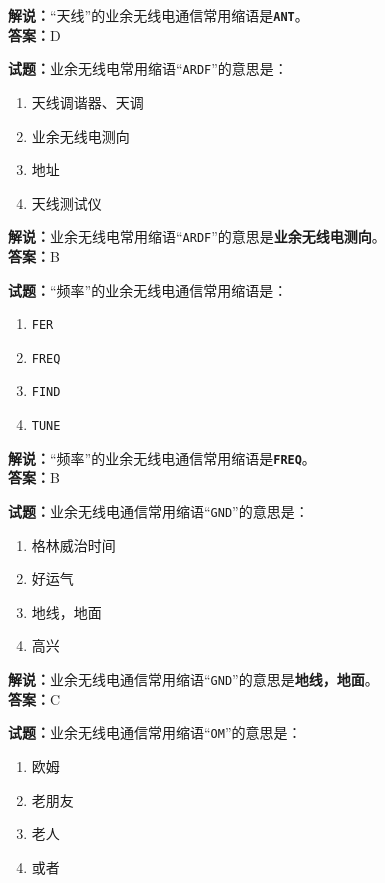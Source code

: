 \documentclass{ctexbook}
\begin{document}
\noindent\textbf{解说：}“天线”的业余无线电通信常用缩语是\texttt{\textbf{ANT}}。\\\noindent\textbf{答案：}D

\bigskip

\noindent\textbf{试题：}业余无线电常用缩语“\texttt{ARDF}”的意思是：

\begin{enumerate}[leftmargin=3em]
  \item 天线调谐器、天调
  \item 业余无线电测向
  \item 地址
  \item 天线测试仪
\end{enumerate}

\noindent\textbf{解说：}业余无线电常用缩语“\texttt{ARDF}”的意思是\textbf{业余无线电测向}。\\\noindent\textbf{答案：}B

\bigskip

\noindent\textbf{试题：}“频率”的业余无线电通信常用缩语是：
\begin{enumerate}[leftmargin=3em]
  \item \texttt{FER}
  \item \texttt{FREQ}
  \item \texttt{FIND}
  \item \texttt{TUNE}
\end{enumerate}

\noindent\textbf{解说：}“频率”的业余无线电通信常用缩语是\texttt{\textbf{FREQ}}。\\\noindent\textbf{答案：}B

\bigskip

\noindent\textbf{试题：}业余无线电通信常用缩语“\texttt{GND}”的意思是：

\begin{enumerate}[leftmargin=3em]
  \item 格林威治时间
  \item 好运气
  \item 地线，地面
  \item 高兴
\end{enumerate}

\noindent\textbf{解说：}业余无线电通信常用缩语“\texttt{GND}”的意思是\textbf{地线，地面}。\\\noindent\textbf{答案：}C

\bigskip

\noindent\textbf{试题：}业余无线电通信常用缩语“\texttt{OM}”的意思是：

\begin{enumerate}[leftmargin=3em]
  \item 欧姆
  \item 老朋友
  \item 老人
  \item 或者
\end{enumerate}
\end{document}
